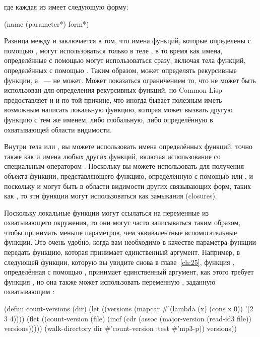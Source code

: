 \noindent{}где каждая из  имеет следующую форму:

\begin{myverb}
(name (parameter*) form*)
\end{myverb}

Разница между  и  заключается в том, что имена функций, которые
определены с помощью , могут использоваться только в теле , в то
время как имена, определённые с помощью  могут использоваться сразу, включая
тела функций, определённых с помощью . Таким образом,  может
определять рекурсивные функции, а ~--- не может.  Может показаться ограничением
то, что  не может быть использован для определения рекурсивных функций, но
Common Lisp предоставляет и  и  по той причине, что иногда бывает
полезным иметь возможным написать локальную функцию, которая может вызвать другую функцию
с тем же именем, либо глобальную, либо определённую в охватывающей области видимости.

Внутри тела  или , вы можете использовать имена определённых
функций, точно также как и имена любых других функций, включая использование со
специальным оператором .  Поскольку вы можете использовать 
для получения объекта-функции, представляющего функцию, определённую с помощью 
или , и поскольку  и  могут быть в области видимости
других связывающих форм, таких как , то эти функции могут использоваться как
замыкания (closures).

Поскольку локальные функции могут ссылаться на переменные из охватывающего окружения, то
они могут часто записываться таким образом, чтобы принимать меньше параметров, чем
эквивалентные вспомогательные функции.  Это очень удобно, когда вам необходимо в качестве
параметра-функции передать функцию, которая принимает единственный аргумент. Например, в
следующей функции, которую вы увидите снова в главе~\ref{ch:25}, функция
, определённая с помощью , принимает единственный аргумент,
как этого требует функция , но она также может использовать
переменную , заданную охватывающим :

\begin{myverb}
(defun count-versions (dir)
  (let ((versions (mapcar #'(lambda (x) (cons x 0)) '(2 3 4))))
    (flet ((count-version (file)
             (incf (cdr (assoc (major-version (read-id3 file)) versions)))))
      (walk-directory dir #'count-version :test #'mp3-p))
    versions))
\end{myverb}

